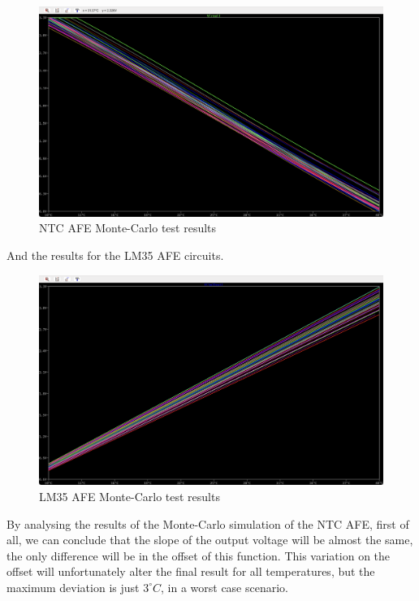 \documentclass[12pt]{article}
\begin{document}
    \begin{figure}[H]
        \centering
        \includegraphics*[scale = 0.3]{images/montecarlo ntc.png}
        \caption{NTC AFE Monte-Carlo test results}
        \label{montecarlontc}
    \end{figure}

    And the results for the LM35 AFE circuits.

    \begin{figure}[H]
        \centering
        \includegraphics*[scale = 0.3]{images/montecarlo lm35.png}
        \caption{LM35 AFE Monte-Carlo test results}
        \label{montecarlolm}
    \end{figure}

    By analysing the results of the Monte-Carlo simulation of the NTC AFE, first of all, we can conclude that the
    slope of the output voltage will be almost the same, the only difference will be in the offset of this function.
    This variation on the offset will unfortunately alter the final result for all temperatures, but the maximum deviation is just  $3^\circ C$, in a worst case scenario.
\end{document}
